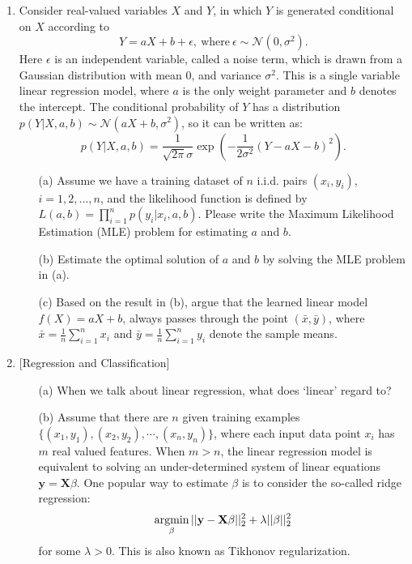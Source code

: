 \documentclass[10pt]{article}
\begin{document}
\begin{enumerate}[1.]
	\item {} Consider real-valued variables $X$ and $Y$, in which $Y$ is generated conditional on $X$ according to
	$$
	Y = aX + b + \epsilon, \ \text{where} \ \epsilon \sim \mathcal{N}(0, \sigma^2).
	$$
	Here $\epsilon$ is an independent variable, called a noise term, which is drawn from a Gaussian distribution with mean 0,
	and variance $\sigma^2$. This is a single variable linear regression model, where $a$ is the only weight parameter and $b$ denotes the intercept.
	The conditional probability of $Y$ has a distribution $p(Y | X, a, b) \sim \mathcal{N}(aX+b, \sigma^2)$, so it can be written as:
	$$
	p(Y|X, a,b) = \frac{1}{\sqrt{2\pi}\sigma}\exp\left(-\frac{1}{2\sigma^2}(Y - aX -b)^2\right).
	$$
	\begin{itemize}
		\item[(a)] Assume we have a training dataset of $n$ i.i.d. pairs $(x_i, y_i)$, $i = 1, 2, ..., n$, and
		the likelihood function is defined by $L(a,b) = \prod_{i=1}^n p(y_i | x_i, a, b)$. Please write the
		Maximum Likelihood Estimation (MLE) problem for estimating $a$ and $b$.~
		\item[(b)] Estimate the optimal solution of $a$ and $b$ by solving the MLE problem in (a).~
		\item[(c)] Based on the result in (b), argue that the learned linear model $f(X) = aX + b$,
		always passes through the point $(\bar{x},\bar{y})$,
		where $\bar{x} = \tfrac{1}{n}\sum_{i=1}^{n}x_{i}$ and $\bar{y} = \tfrac{1}{n}\sum_{i=1}^{n}y_{i}$ denote the sample means.~
	\end{itemize}





	      \newpage

	\item {} [Regression and Classification]
	      \begin{itemize}
			\item[(a)] When we talk about linear regression, what does `linear' regard to? 
			\item[(b)] Assume that there are $n$ given training examples $\{(x_1, y_1), (x_2, y_2), \cdots, (x_n, y_n)\}$,
			where each input data point $x_i$ has $m$ real valued features. When $m > n$, the linear regression model
			is equivalent to solving an under-determined system of linear equations $\mathbf{y} = \mathbf{X}\beta$. One popular way to
			estimate $\beta$ is to consider the so-called ridge regression:
			\[\mathop{\rm argmin}_{\beta} ||\mathbf{y}-\mathbf{X}\mathbf{\beta}||_2^2 + \lambda||\beta||_2^2\]
			for some $\lambda > 0$. This is also known as Tikhonov regularization.
			

\end{itemize}
\end{enumerate}
\end{document}
